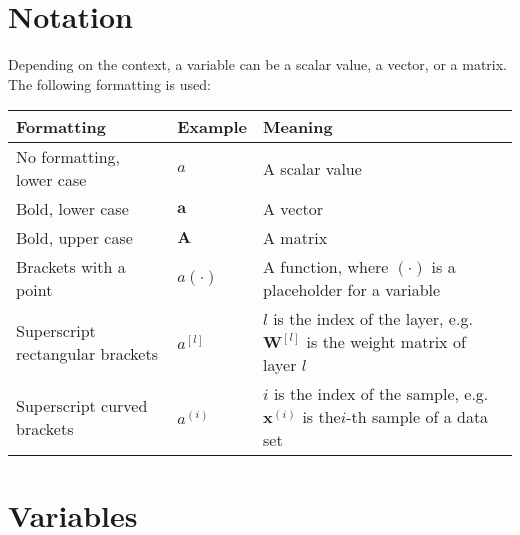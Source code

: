

\section{Notation}

Depending on the context, a variable can be a scalar value, a vector, or a matrix. The following formatting is used:

\begin{tabular}{ p{4cm} p{3cm} p{7cm} }
	\textbf{Formatting} & \textbf{Example} & \textbf{Meaning}\\
	\hline
  	No formatting, lower case & $a$ & A scalar value\\
  	Bold, lower case & $\boldsymbol{a}$ & A vector\\
  	Bold, upper case & $\boldsymbol{A}$ & A matrix\\
  	Brackets with a point & $a(\cdot)$ & A function, where $(\cdot)$ is a placeholder for a variable\\
  	Superscript rectangular brackets & $a^{[l]}$ & $l$ is the index of the layer, e.g. $\boldsymbol{W}^{[l]}$ is the weight matrix of layer $l$\\
  	Superscript curved brackets & $a^{(i)}$ & $i$ is the index of the sample, e.g. $\boldsymbol{x}^{(i)}$ is the$i$-th sample of a data set\\
\end{tabular}


\section{Variables}

